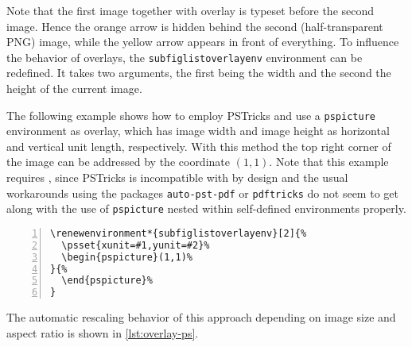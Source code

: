 \documentclass[version=3.12,american]{scrartcl}
\begin{document}
Note that the first image together with overlay is typeset before the second image. Hence the orange arrow is hidden behind the second (half-transparent PNG) image, while the yellow arrow appears in front of everything. To influence the behavior of overlays, the \texttt{subfiglistoverlayenv} environment can be redefined. It takes two arguments, the first being the width and the second the height of the current image.

The following example shows how to employ PSTricks and use a \texttt{pspicture} environment as overlay, which has image width and image height as horizontal and vertical unit length, respectively. With this method the top right corner of the image can be addressed by the coordinate $(1,1)$. Note that this example requires , since PSTricks is incompatible with  by design and the usual workarounds using the packages \texttt{auto-pst-pdf} or \texttt{pdftricks} do not seem to get along with the use of \texttt{pspicture} nested within self-defined environments properly.

\begin{Verbatim}[numbers=left]
\renewenvironment*{subfiglistoverlayenv}[2]{%
  \psset{xunit=#1,yunit=#2}%
  \begin{pspicture}(1,1)%
}{%
  \end{pspicture}%
}
\end{Verbatim}
%
\renewenvironment*{subfiglistoverlayenv}[2]{%
  \psset{xunit=#1,yunit=#2}%
  \begin{pspicture}(1,1)%
}{%
  \end{pspicture}%
}

The automatic rescaling behavior of this approach depending on image size and aspect ratio is shown in \cref{lst:overlay-ps}.
\end{document}
